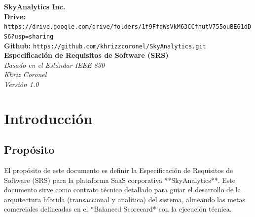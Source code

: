 \documentclass[11pt, letterpaper]{article}
\begin{document}
\begin{titlepage}
    \centering
    \vspace*{1.5cm}

    {\Huge \textbf{SkyAnalytics Inc.}}\\[1cm]
    {\footnotesize\textbf{Drive:} \texttt{https://drive.google.com/drive/folders/1f9FfqWsVkM63CCfhutV755ouBE61dDS6?usp=sharing}}\\[0.2cm]
    {\footnotesize \textbf{Github:} \texttt{https://github.com/khrizzcoronel/SkyAnalytics.git}}\\[0.8cm]
    {\Large \textbf{Especificación de Requisitos de Software (SRS)}}\\[0.3cm]

    {\normalsize \textit{Basado en el Estándar IEEE 830}}\\[0.3cm]
    {\normalsize \textit{Khriz Coronel}}\\[0.3cm]
    {\normalsize \textit{Versión 1.0}}\\[0.3cm]

\end{titlepage}

\tableofcontents
\newpage


\section{Introducción}

\subsection{Propósito}
El propósito de este documento es definir la Especificación de Requisitos de Software (SRS) para la plataforma SaaS corporativa **SkyAnalytics**. Este documento sirve como contrato técnico detallado para guiar el desarrollo de la arquitectura híbrida (transaccional y analítica) del sistema, alineando las metas comerciales delineadas en el *Balanced Scorecard* con la ejecución técnica.
\end{document}
